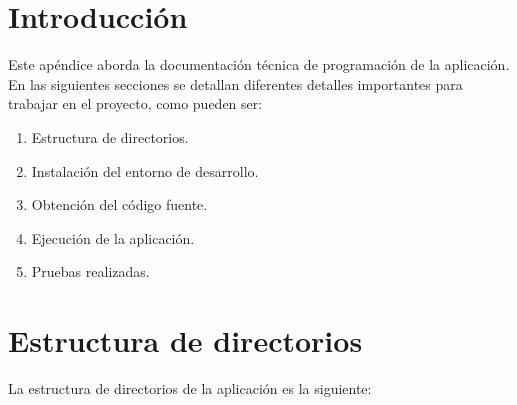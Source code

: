 
\section{Introducción}
Este apéndice aborda la documentación técnica de programación de la aplicación. En las siguientes secciones se detallan diferentes detalles importantes para trabajar en el proyecto, como pueden ser:
\begin{enumerate}
\tightlist

\item Estructura de directorios.
\item Instalación del entorno de desarrollo.
\item Obtención del código fuente.
\item Ejecución de la aplicación.
\item Pruebas realizadas.

\end{enumerate}

\section{Estructura de directorios}

La estructura de directorios de la aplicación es la siguiente:

